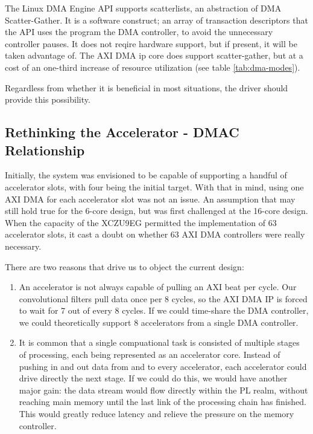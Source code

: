 The Linux DMA Engine API supports scatterlists, an abstraction of DMA Scatter-Gather.
It is a software construct; an array of transaction descriptors that the API uses
the program the DMA controller, to avoid the unnecessary controller pauses.
It does not reqire hardware support, but if present, it will be taken advantage of.
The AXI DMA ip core does support scatter-gather,
but at a cost of an one-third increase of resource utilization (see table \ref{tab:dma-modes}).

Regardless from whether it is beneficial in most situations, the driver should provide this possibility.

\subsection{Rethinking the Accelerator - DMAC Relationship}
\label{sec:future-dmac}

Initially, the system was envisioned to be capable of supporting a handful of accelerator slots, with four being the initial target.
With that in mind, using one AXI DMA for each accelerator slot was not an issue. An assumption that may still hold true for the 6-core design,
but was first challenged at the 16-core design. When the capacity of the XCZU9EG permitted the implementation of 63 accelerator slots,
it cast a doubt on whether 63 AXI DMA controllers were really necessary.

There are two reasons that drive us to object the current design:

\begin{enumerate}
\item	An accelerator is not always capable of pulling an AXI \gls{beat} per cycle. 
	Our convolutional filters pull data once per 8 cycles, so the AXI DMA IP is forced to wait for 7 out of every 8 cycles.
	If we could time-share the DMA controller, we could theoretically support 8 accelerators from a single DMA controller.
\item	It is common that a single compuational task is consisted of multiple stages of processing, each being represented as an
	accelerator core. Instead of pushing in and out data from and to every accelerator, each accelerator could drive directly
	the next stage. If we could do this, we would have another major gain: the data stream would flow directly within the PL realm,
	without reaching main memory until the last link of the processing chain has finished. This would greatly reduce latency
	and relieve the pressure on the memory controller.
\end{enumerate}

